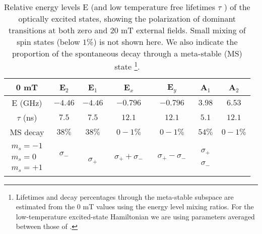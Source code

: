 \documentclass[aps,pra,amsmath,amssymb,reprint,superscriptaddress,tightenlines]{revtex4-1}
\begin{document}
\begin{table}[tbht]
\caption{\label{tbl:zeroFieldES} Relative energy levels E (and low temperature free lifetimes $\tau$ \cite{Goldman15,Collins83}) of the optically excited states, showing the polarization of dominant transitions at both zero and $20$ mT external fields.  Small mixing of spin states (below $1$\%) is not shown here. We also indicate the proportion of the spontaneous decay through a meta-stable (MS) state \footnote{Lifetimes and  decay percentages through the meta-stable subspace are estimated from the 0 mT values using the energy level mixing ratios. For the low-temperature excited-state Hamiltonian we are using parameters averaged between  those of \cite{Tamarat06,Batalov09}.}.}
\begin{ruledtabular}
\begin{tabular}{c | c | c | c | c | c | c}
		0 mT & E$_{2}$ & E$_{1}$ & E$_{x}$ & E$_{y}$ & A$_{1}$ & A$_{2}$ \\
		\hline
		E (GHz) & $-4.46$ & $-4.46$ & $-0.796$ & $-0.796$ & $3.98$ & $6.53$ \\
		$\tau$ (ns) & $7.5$ & $7.5$ & $12.1$ & $12.1$ & $5.1$ & $12.1$ \\
		MS decay & $38\%$ & $38\%$ & $0-1\%$ & $0-1\%$ & $54\%$ & $0-1\%$ \\		
          $\begin{matrix} m_{s}=-1   \\ m_{s}=0 \\ m_{s}=+1 \end{matrix}$
        & $\begin{matrix} \sigma_{-} \\ \: \\ \: \end{matrix}$
        & $\begin{matrix} \: \\ \: \\ \sigma_{+} \end{matrix}$
        & $\begin{matrix} \: \\ \sigma_{+} + \sigma_{-} \\ \: \end{matrix}$
        & $\begin{matrix} \: \\ \sigma_{+} - \sigma_{-} \\ \: \end{matrix}$
        & $\begin{matrix} \sigma_{+} \\ \: \\ \sigma_{-} \end{matrix}$

\end{tabular}
\end{ruledtabular}
\end{table}
\end{document}
